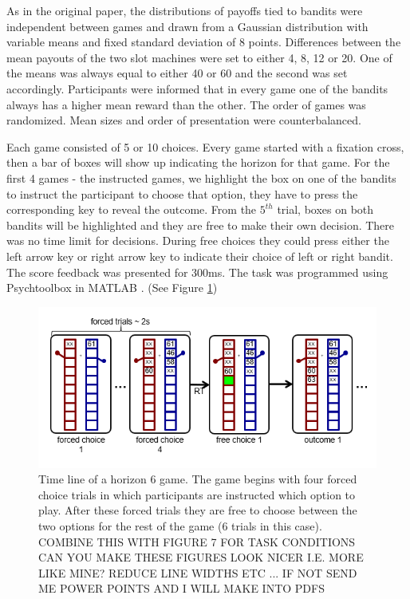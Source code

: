 \documentclass[12pt]{article}
\begin{document}
	As in the original paper, the distributions of payoffs tied to bandits were independent between games and drawn from a Gaussian distribution with variable means and fixed standard deviation of 8 points. Differences between the mean payouts of the two slot machines were set to either 4, 8, 12 or 20. One of the means was always equal to either 40 or 60 and the second was set accordingly. Participants were informed that in every game one of the bandits always has a higher mean reward than the other. The order of games was randomized. Mean sizes and order of presentation were counterbalanced. 
	
	Each game consisted of 5 or 10 choices. Every game started with a fixation cross, then a bar of boxes will show up indicating the horizon for that game. For the first 4 games - the instructed games, we highlight the box on one of the bandits to instruct the participant to choose that option, they have to press the corresponding key to reveal the outcome. From the $5^{th}$ trial, boxes on both bandits will be highlighted and they are free to make their own decision. There was no time limit for decisions. During free choices they could press either the left arrow key or right arrow key to indicate their choice of left or right bandit. The score feedback was presented for 300ms. The task was programmed using Psychtoolbox in MATLAB \citep{psychtoolbox1, psychtoolbox2}. (See Figure \ref{fig:taskfig1})
	
	\begin{figure}[H]
		\begin{center}
			\includegraphics[width=\textwidth]{figures/taskfig1.PNG}
			\caption{Time line of a horizon 6 game.  The game begins with four forced choice trials in which participants are instructed which option to play.   After these forced trials they are free to choose between the two options for the rest of the game (6 trials in this case).
			COMBINE THIS WITH FIGURE 7 FOR TASK CONDITIONS
			CAN YOU MAKE THESE FIGURES LOOK NICER I.E. MORE LIKE MINE?  REDUCE LINE WIDTHS ETC ... IF NOT SEND ME POWER POINTS AND I WILL MAKE INTO PDFS}
			\label{fig:taskfig1}
		\end{center}
	\end{figure}
	
\end{document}
